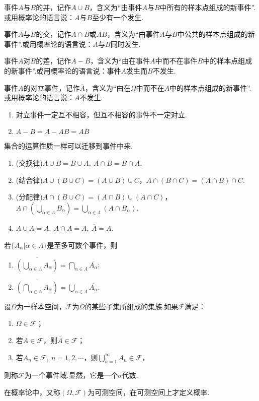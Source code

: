 事件$A$与$B$的并，记作$A\cup B$，含义为“由事件$A$与$B$中所有的样本点组成的新事件”.或用概率论的语言说：$A$与$B$至少有一个发生.

事件$A$与$B$的交，记作$A\cap B$或$AB$，含义为“由事件$A$与$B$中公共的样本点组成的新事件”.或用概率论的语言说：$A$与$B$同时发生.

事件$A$对$B$的差，记作$A-B$，含义为“由在事件$A$中而不在事件$B$中的样本点组成的新事件”.或用概率论的语言说：事件$A$发生而$B$不发生.

事件$A$的对立事件，记作$\overline{A}$，含义为“由在$\varOmega$中而不在$A$中的样本点组成的新事件”.或用概率论的语言说：$A$不发生.

\begin{remark}
	\begin{enumerate}[(1)]
		\item 对立事件一定互不相容，但互不相容的事件不一定对立.
		\item $A-B=A-AB=A\overline{B}$
	\end{enumerate}
\end{remark}

集合的运算性质一样可以迁移到事件中来.
\begin{theorem}
	\begin{enumerate}[(1)]
		\item (交换律)$A\cup B=B\cup A,\ A\cap B=B\cap A$.
		\item (结合律)$A\cup(B\cup C)=(A\cup B)\cup C$，$A\cap(B\cap C)=(A\cap B)\cap C$.
		\item (分配律)$A\cap (B\cup C)=(A\cap B)\cup(A\cap C)$，$A\cap(\bigcup\limits_{\alpha\in\Lambda}B_\alpha)=\bigcup\limits_{\alpha\in\Lambda}(A\cap B_\alpha)$.
		\item $A\cup A=A,\ A\cap A=A,\ \overline{\overline{A}}=A$.
	\end{enumerate}
\end{theorem}
\begin{theorem}[De\ Morgan公式]
	若$\{A_\alpha|\alpha\in \Lambda\}$是至多可数个事件，则
	\begin{enumerate}[(1)]
		\item $\overline{(\bigcup\limits_{\alpha\in\Lambda}A_\alpha)}=\bigcap\limits_{\alpha\in\Lambda}\overline{A_\alpha}$;
		\item $\overline{(\bigcap\limits_{\alpha\in\Lambda}A_\alpha)}=\bigcup\limits_{\alpha\in\Lambda}\overline{A_\alpha}$.
	\end{enumerate}
\end{theorem}
\begin{definition}[事件域]
	设$\varOmega$为一样本空间，$\mathscr{F}$为$\varOmega$的某些子集所组成的集族.如果$\mathscr{F}$满足：
	\begin{enumerate}
		\item $\varOmega\in\mathscr{F}$；
		\item 若$A\in\mathscr{F}$，则$\overline{A}\in\mathscr{F}$；
		\item 若$A_n\in\mathscr{F},\ n=1,2,\cdots$，则$\bigcup\limits_{n=1}^{\infty}A_n\in\mathscr{F}$，
	\end{enumerate}
	则称$\mathscr{F}$为一个{\heiti 事件域}.显然，它是一个$\sigma$代数.
\end{definition}
在概率论中，又称$(\varOmega,\mathscr{F})$为{\heiti 可测空间}，在可测空间上才定义概率.

